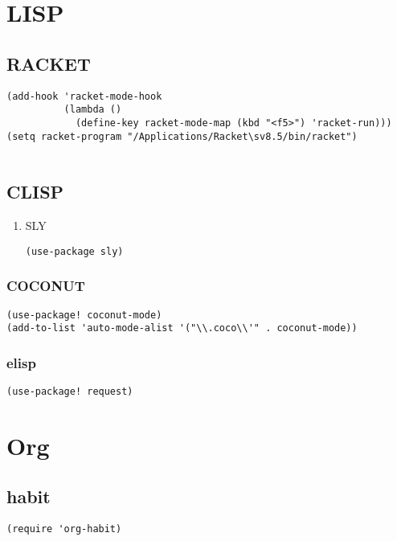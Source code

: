 \documentclass[11pt]{article}
\begin{document}
\section{LISP}
\label{sec:orge4084eb}
\subsection{RACKET}
\label{sec:org75e0375}
\begin{verbatim}
(add-hook 'racket-mode-hook
          (lambda ()
            (define-key racket-mode-map (kbd "<f5>") 'racket-run)))
(setq racket-program "/Applications/Racket\sv8.5/bin/racket")


\end{verbatim}
\subsection{CLISP}
\label{sec:orgcfadbcf}
\begin{enumerate}
\item SLY
\label{sec:org4ca0487}
\begin{verbatim}
(use-package sly)
\end{verbatim}
\end{enumerate}

\subsubsection{COCONUT}
\label{sec:org6e9a033}
\begin{verbatim}
(use-package! coconut-mode)
(add-to-list 'auto-mode-alist '("\\.coco\\'" . coconut-mode))
\end{verbatim}
\subsubsection{elisp}
\label{sec:org580bf1b}
\begin{verbatim}
(use-package! request)
\end{verbatim}

\section{Org}
\label{sec:orga3dd317}

\subsection{habit}
\label{sec:org3698b82}
\begin{verbatim}
(require 'org-habit)
\end{verbatim}
\end{document}
